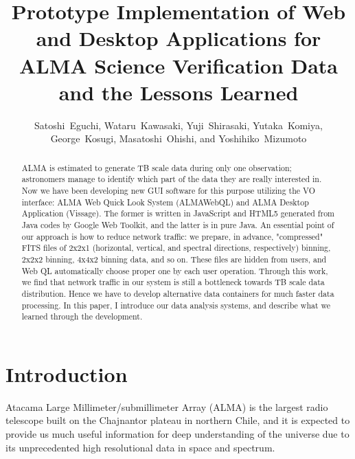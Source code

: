 
\resetcounters




\title{Prototype Implementation of Web and Desktop Applications for ALMA Science Verification Data and the Lessons Learned}
\author{Satoshi~Eguchi, Wataru~Kawasaki, Yuji~Shirasaki, Yutaka~Komiya, George~Kosugi, Masatoshi~Ohishi, and Yoshihiko~Mizumoto
}


\begin{abstract}
ALMA is estimated to generate TB scale data during only one observation; astronomers manage to identify which part of the data they are really interested in.
Now we have been developing new GUI software for this purpose utilizing the VO interface: ALMA Web Quick Look System (ALMAWebQL) and ALMA Desktop Application (Vissage).
The former is written in JavaScript and HTML5 generated from Java codes by Google Web Toolkit, and the latter is in pure Java.
An essential point of our approach is how to reduce network traffic: we prepare, in advance, "compressed" FITS files of 2x2x1 (horizontal, vertical, and spectral directions, respectively) binning, 2x2x2 binning, 4x4x2 binning data, and so on.
These files are hidden from users, and Web QL automatically choose proper one by each user operation.
Through this work, we find that network traffic in our system is still a bottleneck towards TB scale data distribution.
Hence we have to develop alternative data containers for much faster data processing.
In this paper, I introduce our data analysis systems, and describe what we learned through the development.
\end{abstract}

\section{Introduction}

Atacama Large Millimeter/submillimeter Array (ALMA) is the largest radio telescope
built on the Chajnantor plateau in northern Chile, and it is expected to provide us
much useful information for deep understanding of the universe due to its unprecedented
high resolutional data in space and spectrum.

